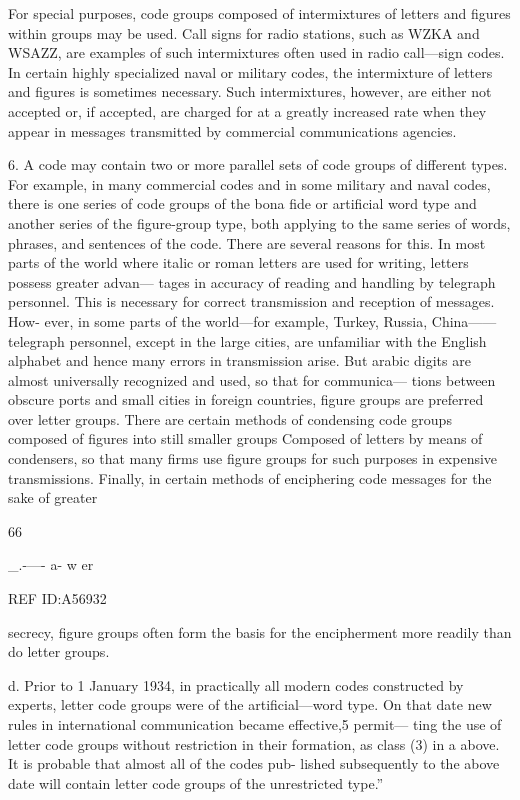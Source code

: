\mypara For special purposes, code groups composed of intermixtures of
letters and ﬁgures within groups may be used. Call signs for radio
stations, such as WZKA and WSAZZ, are examples of such intermixtures often used in radio call—sign codes. In certain highly specialized
naval or military codes, the intermixture of letters and ﬁgures is sometimes necessary. Such intermixtures, however, are either not accepted or,
if accepted, are charged for at a greatly increased rate when they appear
in messages transmitted by commercial communications agencies.

6. A code may contain two or more parallel sets of code groups of
different types. For example, in many commercial codes and in some
military and naval codes, there is one series of code groups of the bona
ﬁde or artiﬁcial word type and another series of the ﬁgure-group type,
both applying to the same series of words, phrases, and sentences of the
code. There are several reasons for this. In most parts of the world where
italic or roman letters are used for writing, letters possess greater advan—
tages in accuracy of reading and handling by telegraph personnel. This
is necessary for correct transmission and reception of messages. How-
ever, in some parts of the world—for example, Turkey, Russia, China——
telegraph personnel, except in the large cities, are unfamiliar with the
English alphabet and hence many errors in transmission arise. But arabic
digits are almost universally recognized and used, so that for communica—
tions between obscure ports and small cities in foreign countries, ﬁgure
groups are preferred over letter groups. There are certain methods of
condensing code groups composed of ﬁgures into still smaller groups
Composed of letters by means of condensers, so that many ﬁrms use
ﬁgure groups for such purposes in expensive transmissions. Finally, in
certain methods of enciphering code messages for the sake of greater

66

_.-—- a- w er

 

 

REF ID:A56932

 

secrecy, ﬁgure groups often form the basis for the encipherment more
readily than do letter groups.

d. Prior to 1 January 1934, in practically all modern codes constructed
by experts, letter code groups were of the artiﬁcial—word type. On that
date new rules in international communication became effective,5 permit—
ting the use of letter code groups without restriction in their formation,
as class (3) in a above. It is probable that almost all of the codes pub-
lished subsequently to the above date will contain letter code groups of
the unrestricted type.”

